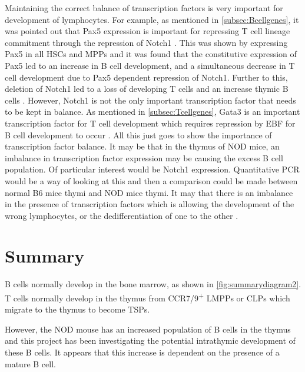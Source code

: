 Maintaining the correct balance of transcription factors is very important for development of lymphocytes. 
For example, as mentioned in \cref{subsec:Bcellgenes}, it was pointed out that Pax5 expression is important for repressing T cell lineage commitment through the repression of Notch1 \citep{Souabni2002}.
This was shown by expressing Pax5 in all HSCs and MPPs and it was found that the constitutive expression of Pax5 led to an increase in B cell development, and a simultaneous decrease in T cell development due to Pax5 dependent repression of Notch1.
Further to this, deletion of Notch1 led to a loss of developing T cells and an increase thymic B cells \citep{Feyerabend2009}.
However, Notch1 is not the only important transcription factor that needs to be kept in balance.
As mentioned in \cref{subsec:Tcellgenes}, Gata3 is an important transcription factor for T cell development which requires repression by EBF for B cell development to occur \citep{Banerjee2013}.
All this just goes to show the importance of transcription factor balance.
It may be that in the thymus of NOD mice, an imbalance in transcription factor expression may be causing the excess B cell population.
Of particular interest would be Notch1 expression.
Quantitative PCR would be a way of looking at this and then a comparison could be made between normal B6 mice thymi and NOD mice thymi.
It may that there is an imbalance in the presence of transcription factors which is allowing the development of the wrong lymphocytes, or the dedifferentiation of one to the other \citep{Cobaleda2007}.




\section{Summary}

B cells normally develop in the bone marrow, as shown in \cref{fig:summarydiagram2}.
T cells normally develop in the thymus from CCR7/9\textsuperscript{+} LMPPs or CLPs which migrate to the thymus to become TSPs.

However, the NOD mouse has an increased population of B cells in the thymus and this project has been investigating the potential intrathymic development of these B cells.
It appears that this increase is dependent on the presence of a mature B cell.

